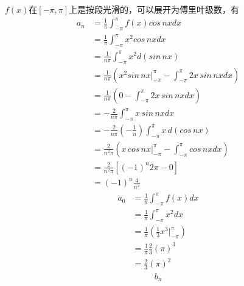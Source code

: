 \documentclass{article}
\begin{document}
\begin{itemize}
\begin{itemize}
                $f(x)$在$[-\pi, \pi]$上是按段光滑的，可以展开为傅里叶级数，有
                \begin{align*}
                  a_n
                   & = \frac{1}{\pi} \int_{-\pi}^{\pi} f(x) cos\, nx dx                                                     \\
                   & = \frac{1}{\pi} \int_{-\pi}^{\pi} x^2 cos\, nx dx                                                      \\
                   & = \frac{1}{n\pi} \int_{-\pi}^{\pi} x^2 d(sin\, nx)                                                     \\
                   & = \frac{1}{n\pi}\left( x^2 sin\, nx \bigg|_{-\pi}^{\pi} - \int_{-\pi}^{\pi} 2 x \, sin\, nx dx \right) \\
                   & = \frac{1}{n\pi}\left( 0 - \int_{-\pi}^{\pi} 2 x \, sin\, nx dx \right)                                \\
                   & = -\frac{2}{n\pi} \int_{-\pi}^{\pi} x \, sin\, nx dx                                                   \\
                   & = -\frac{2}{n\pi} (- \frac{1}{n}) \int_{-\pi}^{\pi} x \, d(cos\, nx)                                   \\
                   & = \frac{2}{n^2\pi}  \left( x \, cos\, nx \bigg|_{-\pi}^{\pi} - \int_{-\pi}^{\pi} cos\, nx dx \right)   \\
                   & = \frac{2}{n^2\pi}  \left[ (-1)^n 2\pi - 0 \right]                                                     \\
                   & = (-1)^n \frac{4}{n^2}
                \end{align*}
                \begin{align*}
                  a_0
                   & = \frac{1}{\pi} \int_{-\pi}^{\pi} f(x) dx                        \\
                   & = \frac{1}{\pi} \int_{-\pi}^{\pi} x^2 dx                         \\
                   & = \frac{1}{\pi} \left(\frac{1}{3}x^3 \bigg|_{-\pi}^{\pi} \right) \\
                   & = \frac{1}{\pi} \frac{2}{3} (\pi)^3                              \\
                   & = \frac{2}{3} (\pi)^2
                \end{align*}
                \begin{align*}
                  b_n

\end{align*}
\end{itemize}
\end{itemize}
\end{document}

